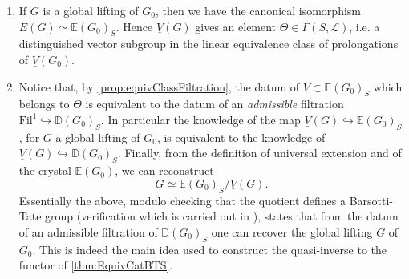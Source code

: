 \begin{rem}[]
\begin{enumerate}
	\item If $G$ is a global lifting of $G_0$, then we have the canonical isomorphism
		$E(G) \simeq \mathbb{E}(G_0)_S$.
		Hence $\underline{V}(G)$ gives an element $\Theta \in \Gamma(S,\mathscr{L})$,
		i.e. a distinguished vector subgroup in the linear equivalence
		class of prolongations of $\underline{V}(G_0)$.

	\item Notice that, by \cref{prop:equivClassFiltration}, the datum of 
		$V \subset \mathbb{E}(G_0)_S$ which belongs to $\Theta$ is
		equivalent to the datum of an {\em admissible} filtration
		$\mathrm{Fil}^1 \hookrightarrow \mathbb{D}(G_0)_S$.
		In particular the knowledge of the map
		$\underline{V}(G) \hookrightarrow \mathbb{E}(G_0)_S$, for $G$ a global
		lifting of $G_0$, is equivalent to the knowledge of
		$\underline{V}(G) \hookrightarrow \mathbb{D}(G_0)_S$.
		Finally, from the definition of universal extension
		and of the crystal $\mathbb{E}(G_0)$, we can reconstruct 
		\begin{equation*}
			G \simeq \mathbb{E}(G_0)_S/\underline{V}(G)
		.\end{equation*}
		Essentially the above, modulo checking that the quotient defines
		a Barsotti-Tate group (verification which is carried out in
		\cite[Chapter V, theorem 1.6]{Messing}), states that from 
		the datum of an admissible filtration of $\mathbb{D}(G_0)_S$
		one can recover the global lifting $G$ of $G_0$.
		This is indeed the main idea used to construct the quasi-inverse
		to the functor of \cref{thm:EquivCatBTS}.
\end{enumerate}
\end{rem}
